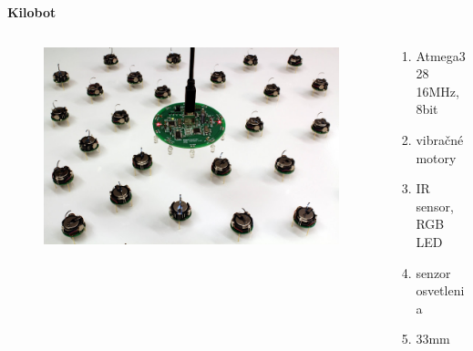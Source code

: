 \documentclass[xcolor=dvipsnames]{beamer}
\begin{document}
\begin{frame}{\bf Kilobot}
\begin{columns}
	\begin{column}{0.48\textwidth}

	\begin{figure}[ht]
	\begin{center}
	\begin{minipage}{0.9\linewidth}
	\begin{center}
	\includegraphics[width=1.0\textwidth]{images/kilobot.jpg}
	\end{center}
	\end{minipage}
	\end{center}
	\end{figure}

	\end{column}
	\begin{column}{0.48\textwidth}
		\begin{enumerate}
			\item Atmega328 16MHz, 8bit
            \item vibračné motory
			\item IR sensor, RGB LED
			\item senzor osvetlenia
            \item 33mm
		\end{enumerate}
	\end{column}
\end{columns}

\end{frame}
\end{document}
